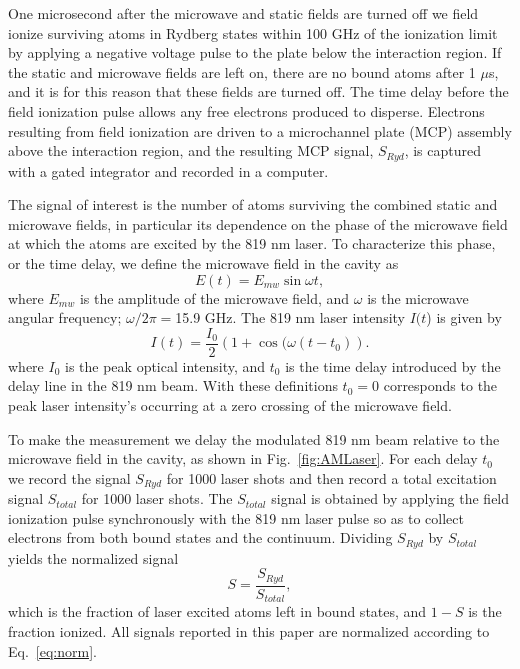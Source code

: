 \documentclass[aps,pra,reprint,groupedaddress]{revtex4-1}
\begin{document}
One microsecond after the microwave and static fields are turned off we field ionize surviving atoms in Rydberg states within 100 GHz of the ionization limit by applying a negative voltage pulse to the plate below the interaction region. If the static and microwave fields are left on, there are no bound atoms after 1 $\mu$s, and it is for this reason that these fields are turned off. The time delay before the field ionization pulse allows any free electrons produced to disperse. Electrons resulting from field ionization are driven to a microchannel plate (MCP) assembly above the interaction region, and the resulting MCP signal, $S_{Ryd}$, is captured with a gated integrator and recorded in a computer.

The signal of interest is the number of atoms surviving the combined static and microwave fields, in particular its dependence on the phase of the microwave field at which the atoms are excited by the 819 nm laser.
To characterize this phase, or the time delay, we define the microwave field in the cavity as
\begin{equation}
E(t) =E_{mw}\sin{\omega t},
\end{equation}
where $E_{mw}$ is the amplitude of the microwave field, and $\omega$ is the microwave angular frequency; $\omega/2\pi=$15.9 GHz. The 819 nm laser intensity $I(t$) is given by
\begin{equation} \label{eq:AMLaser}
I(t) =\frac{I_0}{2}(1+\cos{(\omega (t-t_0)}).
\end{equation}
where $I_0$ is the peak optical intensity, and $t_0$ is the time delay introduced by the delay line in the 819 nm beam. With these definitions $t_0=0$ corresponds to the peak laser intensity's occurring at a zero crossing of the microwave field.

To make the measurement we delay the modulated 819 nm beam relative to the microwave field in the cavity, as shown in Fig.~\ref{fig:AMLaser}. For each delay $t_0$ we record the signal $S_{Ryd}$ for 1000 laser shots and then record a total excitation signal $S_{total}$ for 1000 laser shots. The $S_{total}$ signal is obtained by applying the field ionization pulse synchronously with the 819 nm laser pulse so as to collect electrons from both bound states and the continuum. Dividing $S_{Ryd}$ by $S_{total}$ yields the normalized signal
\begin{equation} \label{eq:norm}
S=\frac{S_{Ryd}}{S_{total}},
\end{equation}
which is the fraction of laser excited atoms left in bound states, and $1-S$ is the fraction ionized. All signals reported in this paper are normalized according to Eq.~\ref{eq:norm}.
\end{document}

